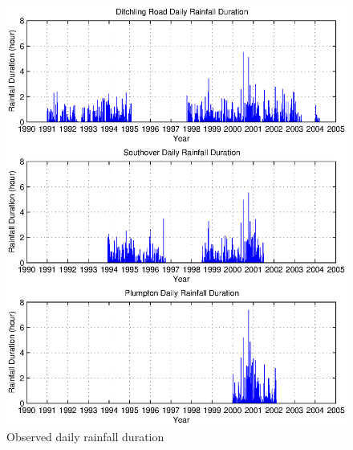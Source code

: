 \begin{figure}[htbp]
  \centering
    \includegraphics[width=1.0\textwidth]{./img/obs_daily_duration}
  \caption{Observed daily rainfall duration}
  \label{fig:obs_daily_duration}
\end{figure}

